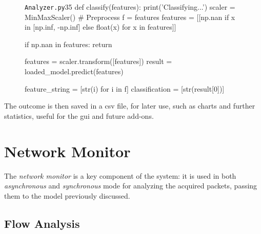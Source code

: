 \begin{figure}[h!]
    \begin{code}[colback=white]{\texttt{Analyzer.py}}{35}
def classify(features):
    print('Classifying...')
    scaler = MinMaxScaler()
    # Preprocess
    f = features
    features = [[np.nan if x in [np.inf, -np.inf]
                  else float(x) for x in features]]

    if np.nan in features:
        return

    features = scaler.transform([features])
    result = loaded_model.predict(features)

    feature_string = [str(i) for i in f]
    classification = [str(result[0])]
\end{code}
\end{figure}

\noindent The outcome is then saved in a \gls{csv} file, for later use, such as charts and further statistics, useful for the \gls{gui} and future add-ons. 


\section{Network Monitor}
\label{sec:monitor-implementation}

The \textit{network monitor} is a key component of the system: it is used in both \textit{asynchronous} and \textit{synchronous} mode for analyzing the acquired packets, passing them to the model previously discussed.


\subsection{Flow Analysis}
\label{subsec:flow-analysis}

